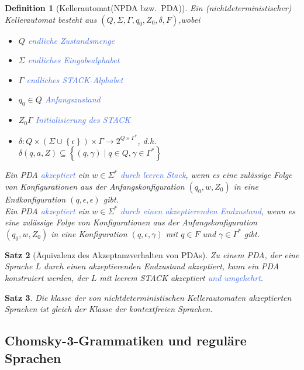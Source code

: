 \documentclass[11pt]{article}
\newcommand{\tcol}[1]{\textcolor{RoyalBlue}{#1}}
\newcommand{\set}[1]{\left\lbrace #1\right\rbrace}
\theoremstyle{break}
\newtheorem{satz}{Satz}[section]
\newtheorem{defi}[satz]{Definition}
\begin{document}
    \begin{defi}[Kellerautomat(NPDA bzw.\ PDA)]
        Ein (nichtdeterministischer) Kellerautomat besteht aus $(Q,\Sigma,\Gamma,q_0,Z_0,\delta,F)$,wobei
        \begin{itemize}
            \item $Q$ \tcol{endliche Zustandsmenge}
            \item $\Sigma$ \tcol{endliches Eingabealphabet}
            \item $\Gamma$ \tcol{endliches STACK-Alphabet}
            \item $q_0\in Q$ \tcol{Anfangszustand}
            \item $Z_0\Gamma$ \tcol{Initialisierung des STACK}
            \item $\delta\colon Q\times(\Sigma\cup\set{\epsilon})\times\Gamma\to 2^{Q\times\Gamma^*}$, d.h. $\delta(q,a,Z)\subseteq\set{(q,\gamma)\mid q\in Q,\gamma\in\Gamma^*}$
        \end{itemize}
        Ein PDA \tcol{akzeptiert} ein $w\in\Sigma^*$ \tcol{durch leeren Stack}, wenn es eine zulässige Folge von Konfigurationen aus der Anfangskonfiguration $(q_0,w,Z_0)$ in eine Endkonfiguration $(q,\epsilon,\epsilon)$ gibt.\\
        Ein PDA \tcol{akzeptiert} ein $w\in\Sigma^*$ \tcol{durch einen akzeptierenden Endzustand}, wenn es eine zulässige Folge von Konfigurationen aus der Anfangskonfiguration $(q_0,w,Z_0)$ in eine Konfiguration $(q,\epsilon,\gamma)$ mit $q\in F$ und $\gamma\in\Gamma^*$ gibt.
    \end{defi}

    \begin{satz}[Äquivalenz des Akzeptanzverhalten von PDAs]
        Zu einem PDA, der eine Sprache $L$ durch einen akzeptierenden Endzustand akzeptiert, kann ein PDA konstruiert werden, der $L$ mit leerem STACK akzeptiert \tcol{und umgekehrt}.
    \end{satz}

    \begin{satz}
        Die klasse der von nichtdeterministischen Kellerautomaten akzeptierten Sprachen ist gleich der Klasse der kontextfreien Sprachen.
    \end{satz}


    \subsection{Chomsky-3-Grammatiken und reguläre Sprachen}
	\label{subsec:chomsky-3-grammatiken-und-reguläre-sprachenindex}
\end{document}
